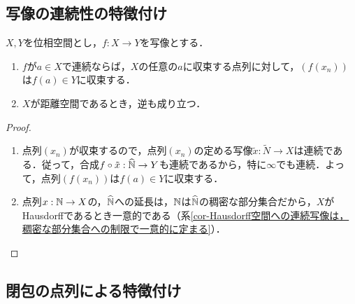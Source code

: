 \documentclass[uplatex,dvipdfmx]{jsreport}
\begin{document}
\subsection{写像の連続性の特徴付け}

\begin{corollary}[連続性の極限の言葉による特徴付け]\label{cor-characterization-of-continuousness-in-terms-of-limits}
    $X,Y$を位相空間とし，$f:X\to Y$を写像とする．
    \begin{enumerate}
        \item $f$が$a\in X$で連続ならば，$X$の任意の$a$に収束する点列に対して，$(f(x_n))$は$f(a)\in Y$に収束する．
        \item $X$が距離空間であるとき，逆も成り立つ．
    \end{enumerate}
\end{corollary}
\begin{proof}\mbox{}
    \begin{enumerate}
        \item 点列$(x_n)$が収束するので，点列$(x_n)$の定める写像$\tilde{x}:\widetilde{N}\to X$は連続である．従って，合成$f\circ\tilde{x}:\widehat{\mathbb{N}}\to Y$も連続であるから，特に$\infty$でも連続．よって，点列$(f(x_n))$は$f(a)\in Y$に収束する．
        \item 点列$x:\mathbb{N}\to X$の，$\widehat{\mathbb{N}}$への延長は，$\mathbb{N}$は$\widehat{\mathbb{N}}$の稠密な部分集合だから，$X$がHausdorffであるとき一意的である（系\ref{cor-Hausdorff空間への連続写像は，稠密な部分集合への制限で一意的に定まる}）．
    \end{enumerate}
\end{proof}

\subsection{閉包の点列による特徴付け}
\end{document}
